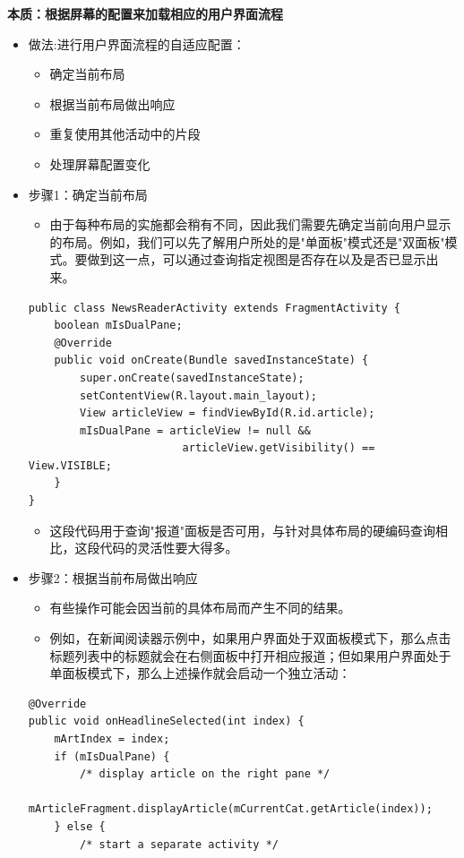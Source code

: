 \documentclass[9pt, b5paper]{article}
\begin{document}
\begin{enumerate}
\textbf{本质：根据屏幕的配置来加载相应的用户界面流程}
\begin{itemize}
\item 做法:进行用户界面流程的自适应配置：
\begin{itemize}
\item 确定当前布局
\item 根据当前布局做出响应
\item 重复使用其他活动中的片段
\item 处理屏幕配置变化
\end{itemize}
\item 步骤1：确定当前布局
\begin{itemize}
\item 由于每种布局的实施都会稍有不同，因此我们需要先确定当前向用户显示的布局。例如，我们可以先了解用户所处的是"单面板"模式还是"双面板"模式。要做到这一点，可以通过查询指定视图是否存在以及是否已显示出来。
\end{itemize}
\begin{verbatim}
public class NewsReaderActivity extends FragmentActivity {
    boolean mIsDualPane;
    @Override
    public void onCreate(Bundle savedInstanceState) {
        super.onCreate(savedInstanceState);
        setContentView(R.layout.main_layout);
        View articleView = findViewById(R.id.article);
        mIsDualPane = articleView != null &&
                        articleView.getVisibility() == View.VISIBLE;
    }
}
\end{verbatim}
\begin{itemize}
\item 这段代码用于查询"报道"面板是否可用，与针对具体布局的硬编码查询相比，这段代码的灵活性要大得多。
\end{itemize}
\item 步骤2：根据当前布局做出响应
\begin{itemize}
\item 有些操作可能会因当前的具体布局而产生不同的结果。
\item 例如，在新闻阅读器示例中，如果用户界面处于双面板模式下，那么点击标题列表中的标题就会在右侧面板中打开相应报道；但如果用户界面处于单面板模式下，那么上述操作就会启动一个独立活动：
\end{itemize}
\begin{verbatim}
@Override
public void onHeadlineSelected(int index) {
    mArtIndex = index;
    if (mIsDualPane) {
        /* display article on the right pane */
        mArticleFragment.displayArticle(mCurrentCat.getArticle(index));
    } else {
        /* start a separate activity */

\end{verbatim}
\end{itemize}
\end{enumerate}
\end{document}
